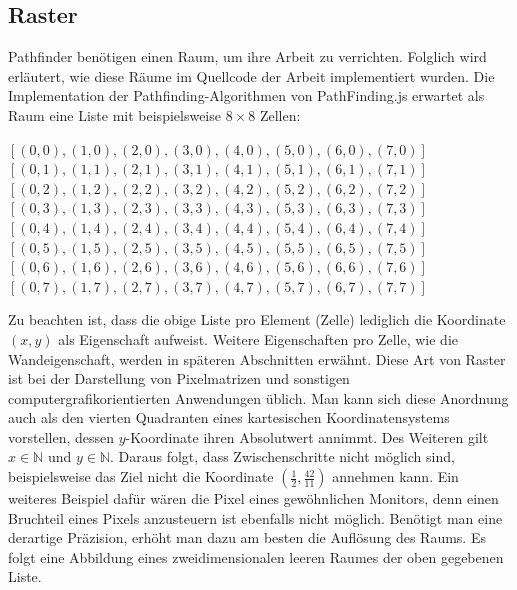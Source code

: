 \documentclass[12pt,a4paper,german]{report}
\begin{document}
\subsection{Raster}
Pathfinder benötigen einen Raum, um ihre Arbeit zu verrichten. Folglich wird erläutert, wie diese Räume im Quellcode der Arbeit implementiert wurden.
Die Implementation der Pathfinding-Algorithmen von PathFinding.js erwartet als Raum eine Liste mit beispielsweise $8\times8$ Zellen: \\
\begin{center}
$[(0,0),(1,0),(2,0),(3,0),(4,0),(5,0),(6,0),(7,0)]$\\
$[(0,1),(1,1),(2,1),(3,1),(4,1),(5,1),(6,1),(7,1)]$\\
$[(0,2),(1,2),(2,2),(3,2),(4,2),(5,2),(6,2),(7,2)]$\\
$[(0,3),(1,3),(2,3),(3,3),(4,3),(5,3),(6,3),(7,3)]$\\
$[(0,4),(1,4),(2,4),(3,4),(4,4),(5,4),(6,4),(7,4)]$\\
$[(0,5),(1,5),(2,5),(3,5),(4,5),(5,5),(6,5),(7,5)]$\\
$[(0,6),(1,6),(2,6),(3,6),(4,6),(5,6),(6,6),(7,6)]$\\
$[(0,7),(1,7),(2,7),(3,7),(4,7),(5,7),(6,7),(7,7)]$
\end{center}
Zu beachten ist, dass die obige Liste pro Element (Zelle) lediglich die Koordinate $(x,y)$ als Eigenschaft aufweist. Weitere Eigenschaften pro Zelle, wie die Wandeigenschaft, werden in späteren Abschnitten erwähnt.
Diese Art von Raster ist bei der Darstellung von Pixelmatrizen und sonstigen computergrafikorientierten Anwendungen üblich. 
Man kann sich diese Anordnung auch als den vierten Quadranten eines kartesischen Koordinatensystems vorstellen, dessen $y$-Koordinate ihren Absolutwert annimmt. 
Des Weiteren gilt $x \in \mathbb{N}$ und $y \in \mathbb{N}$. 
Daraus folgt, dass Zwischenschritte nicht möglich sind, beispielsweise das Ziel nicht die Koordinate $(\frac{1}{2},\frac{42}{11})$ annehmen kann. Ein weiteres Beispiel dafür wären die Pixel eines gewöhnlichen Monitors, denn einen Bruchteil eines Pixels anzusteuern ist ebenfalls nicht möglich.
Benötigt man eine derartige Präzision, erhöht man dazu am besten die Auflösung des Raums. Es folgt eine Abbildung eines zweidimensionalen leeren Raumes der oben gegebenen Liste.
\end{document}
